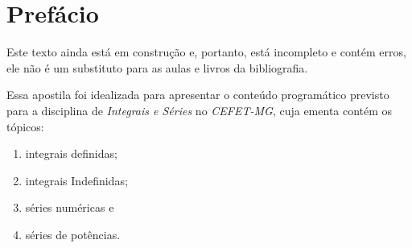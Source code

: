 \chapter{Prefácio}

% 
% 
% 
% 
% 
% 

\vspace{3cm}
\begin{observation}
  Este texto ainda está em construção e, portanto, está incompleto e contém erros,
  ele não é um substituto para as aulas e livros da bibliografia.
\end{observation}
\vspace{3cm}

Essa apostila foi idealizada para apresentar o conteúdo programático previsto para
a disciplina de \emph{Integrais e Séries} no \emph{CEFET-MG},
cuja ementa contém os tópicos:
\begin{enumerate}[nosep, topsep=-0.5\baselineskip]
  \item integrais definidas;
  \item integrais Indefinidas;
  \item séries numéricas e
  \item séries de potências.
\end{enumerate}

